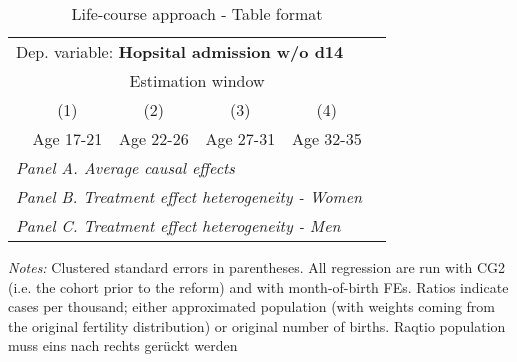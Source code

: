  \begin{table}[H] \centering \begin{threeparttable} \caption{Life-course approach - Table format} {\def\sym#1{\ifmmode^{#1}\else\(^{#1}\)\fi} \begin{tabular}{l*{5}{c}} \toprule \multicolumn{5}{l}{Dep. variable: \textbf{Hopsital admission w/o d14}} \\ & \multicolumn{4}{c}{Estimation window} \\ \cmidrule(lr){2-5}
            &\multicolumn{1}{c}{(1)}&\multicolumn{1}{c}{(2)}&\multicolumn{1}{c}{(3)}&\multicolumn{1}{c}{(4)}\\
            &\multicolumn{1}{c}{Age 17-21}&\multicolumn{1}{c}{Age 22-26}&\multicolumn{1}{c}{Age 27-31}&\multicolumn{1}{c}{Age 32-35}\\
\midrule
 \multicolumn{5}{l}{\emph{Panel A. Average causal effects}} \\      \midrule\multicolumn{5}{l}{\emph{Panel B. Treatment effect heterogeneity - Women}} \\      \midrule\multicolumn{5}{l}{\emph{Panel C. Treatment effect heterogeneity - Men}} \\      
\bottomrule \end{tabular} } \begin{tablenotes} \item \scriptsize \emph{Notes:} Clustered standard errors in parentheses. All regression are run with CG2 (i.e. the cohort prior to the reform) and with month-of-birth FEs. Ratios indicate cases per thousand; either approximated population (with weights coming from the original fertility distribution) or original number of births. Raqtio population muss eins nach rechts gerückt werden \end{tablenotes} \end{threeparttable} \end{table} 
